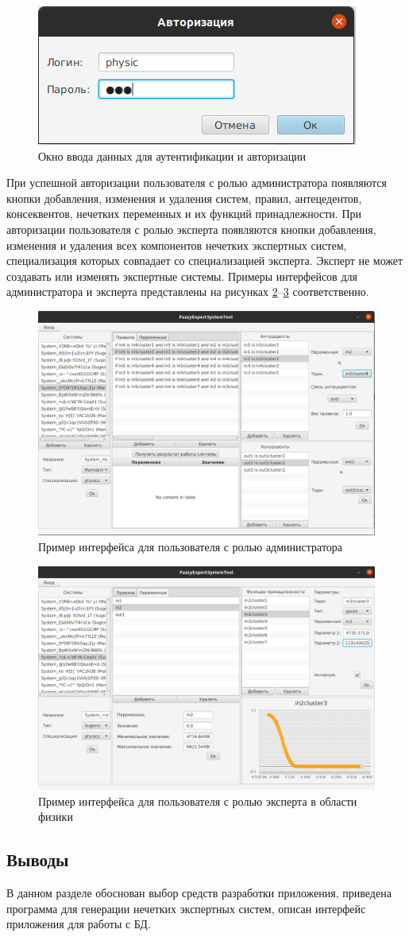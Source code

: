 \begin{figure}[H]
	\centering
	\includegraphics[width=0.4\linewidth]{img/authorize}
	\caption{Окно ввода данных для аутентификации и авторизации}
	\label{fig:authorize}
\end{figure}

При успешной авторизации пользователя с ролью администратора появляются кнопки добавления, изменения и удаления систем, правил, антецедентов, консеквентов, нечетких переменных и их функций принадлежности. При авторизации пользователя с ролью эксперта появляются кнопки добавления, изменения и удаления всех компонентов нечетких экспертных систем, специализация которых совпадает со специализацией эксперта. Эксперт не может создавать или изменять экспертные системы. Примеры интерфейсов для администратора и эксперта представлены на рисунках \ref{fig:admin}--\ref{fig:physic} соответственно. 

\begin{figure}[H]
	\centering
	\includegraphics[width=0.7\linewidth]{img/admin}
	\caption{Пример интерфейса для пользователя с ролью администратора}
	\label{fig:admin}
\end{figure}

\begin{figure}[H]
	\centering
	\includegraphics[width=0.7\linewidth]{img/physic}
	\caption{Пример интерфейса для пользователя с ролью эксперта в области физики}
	\label{fig:physic}
\end{figure}

\subsection{Выводы}
В данном разделе обоснован выбор средств разработки приложения, приведена программа для генерации нечетких экспертных систем, описан интерфейс приложения для работы с БД.

\pagebreak